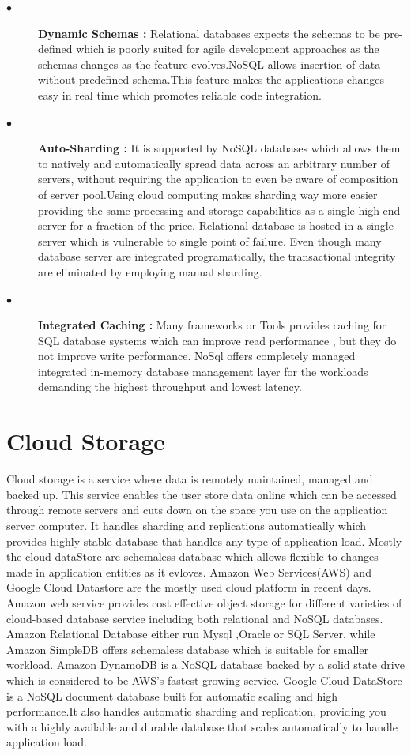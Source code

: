 \begin{description}
	\item[$\bullet$] {\bfseries Dynamic Schemas :} Relational databases expects the schemas to be pre-defined which is poorly suited for agile development approaches as the schemas changes as the feature evolves.NoSQL allows insertion of data without predefined schema.This feature makes the applications changes easy in real time which promotes reliable code integration.
	\item[$\bullet$] {\bfseries Auto-Sharding :} It is supported by NoSQL databases which allows them to natively and automatically spread data across an arbitrary number of servers, without requiring the application to even be aware of composition of server pool.Using cloud computing makes sharding way more easier providing the same processing and storage capabilities as a single high-end server for a fraction of the price. Relational database is hosted in a single server which is vulnerable to single point of failure. Even though many database server are integrated programatically, the transactional integrity are eliminated by employing manual sharding.
	
	\item[$\bullet$] {\bfseries Integrated Caching :} Many frameworks or Tools provides caching for SQL database systems which can improve read performance , but they do not improve write performance. NoSql offers completely managed integrated in-memory database management layer for the workloads demanding the highest throughput and lowest latency.  
	
\end{description}			


\section{Cloud Storage}
		
			Cloud storage is a service where data is remotely maintained, managed and backed up. This service enables the user store data online which can be accessed through remote servers and cuts down on the space you use on the application server computer. It handles sharding and replications automatically which provides highly stable database that handles any type of application load. Mostly the cloud dataStore are schemaless database which allows flexible  to changes made in application entities as it evloves. Amazon Web Services(AWS) and Google Cloud Datastore are the mostly used cloud platform in recent days. Amazon web service provides cost effective object storage for different varieties of cloud-based database service including both relational and NoSQL databases. Amazon Relational Database either run Mysql ,Oracle or SQL Server, while Amazon SimpleDB offers schemaless database which is suitable for smaller workload. Amazon DynamoDB is a NoSQL database backed by a solid state drive which is considered to be AWS's fastest growing service. Google Cloud DataStore is a NoSQL document database built for automatic scaling and high performance.It also handles automatic sharding and replication, providing you with a highly available and durable database that scales automatically to handle application load.
			
									


